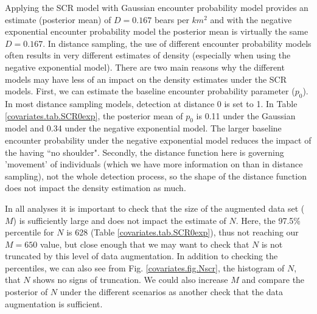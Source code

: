 Applying the SCR model with Gaussian encounter probability model
 provides an
estimate (posterior mean) of $D = 0.167$ bears per $km^2$ and with the
negative exponential encounter probability model
the posterior mean  is virtually the
same $D = 0.167$.  In distance sampling, the use of different
encounter probability models
 often results in very different estimates of density
(especially when using the negative exponential model).  There are
two main reasons why the different models  may have less of
an impact on the density estimates under the SCR models.  First, we
can estimate the baseline encounter probability
 parameter ($p_0$).  
In most
distance sampling models, detection at distance 0 is set to 1.  In
Table \ref{covariates.tab.SCR0exp}, the posterior mean of $p_0$ is
0.11 under the Gaussian  model and 0.34 under the negative
exponential model.  The larger baseline encounter probability
 under the negative
exponential model reduces the impact of the having ``no shoulder".
Secondly, the distance function here is governing 'movement' of
individuals (which we have more information on than in distance
sampling), not the whole detection process, so the shape of the
distance function does not impact the density estimation as much.

In all analyses it is important to check that the size of the
augmented data set ($M$) is sufficiently large and does not impact 
the estimate of $N$.  Here, the 97.5\%
percentile for $N$ is 628 (Table \ref{covariates.tab.SCR0exp}), thus not reaching our $M=650$ value, but
close enough that we may want to check that $N$ is not truncated by
this level of data augmentation.  In addition to checking the percentiles, 
we can also see from Fig. \ref{covariates.fig.Nscr}, the histogram of $N$, that $N$ 
shows no signs of truncation.  We could also increase
$M$ and compare the posterior of $N$ under the different scenarios as another check 
that the data augmentation is sufficient.  


